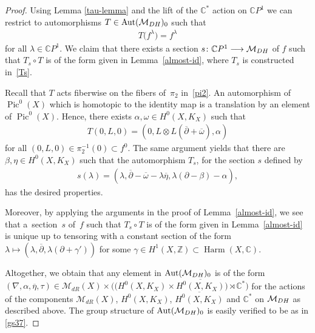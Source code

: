 \documentclass[11pt]{article}
\numberwithin{equation}{section}
\begin{document}
\begin{proof} Using Lemma \ref{tau-lemma} and the lift of the $\mathbb C^*$ action on $\mathbb C P^1$ we can restrict to automorphisms $T\in \operatorname{Aut}(\mathcal M_{\rm DH})_0$ such that
\begin{gather*}T\big(f^\lambda\big) = f^\lambda\end{gather*} for all $\lambda\in\mathbb CP^1$. We claim that there exists a section $s \colon {\mathbb C}P^1 \longrightarrow {\mathcal M}_{\rm DH}$ of $f$ such that $T_s\circ T$ is of the form given in Lemma~\ref{almost-id}, where $T_s$ is constructed in~\eqref{Ts}.

Recall that $T$ acts f\/iberwise on the f\/ibers of~$\pi_2$ in~\eqref{pi2}. An automorphism of $\operatorname{Pic}^0(X)$ which is homotopic to the identity map is a translation by an element of $\operatorname{Pic}^0(X)$. Hence, there exists $\alpha, \omega \in H^0(X, K_X)$ such that
\begin{gather*}T(0, L, 0) = (0, L\otimes L(\overline{\partial}+\overline{\omega}), \alpha)\end{gather*}
for all $(0, L, 0) \in \pi_2^{-1}(0) \subset f^0$. The same argument yields that there are $\beta, \eta \in H^0(X, K_X)$ such that the automorphism $T_s$, for the section $s$ def\/ined by
\begin{gather*}s(\lambda) = (\lambda, \overline{\partial} -\overline{\omega}-\lambda\overline{\eta}, \lambda(\partial-\beta)-\alpha) ,\end{gather*}
has the desired properties.

Moreover, by applying the arguments in the proof of Lemma~\ref{almost-id}, we see that a~section~$s$ of~$f$ such that $T_s\circ T$ is of the form given in Lemma~\ref{almost-id} is unique up to tensoring with a constant section of the form $\lambda \longmapsto (\lambda, \overline{\partial}, \lambda(\partial+\gamma'))$ for some $\gamma \in H^1(X, \mathbb Z) \subset \operatorname{Harm}(X, \mathbb C)$.

Altogether, we obtain that any element in $\operatorname{Aut}({\mathcal M}_{\rm DH})_0$ is of the form $(\nabla, \alpha, \overline{\eta}, \tau)\in\mathcal M_{dR}(X)\times \big(\big(H^0(X, K_X)\times\overline{H^0(X, K_X)}\big)\rtimes {\mathbb C}^*\big)$ for the actions of the components $\mathcal M_{dR}(X)$, $H^0(X, K_X)$, $\overline{H^0(X, K_X)}$ and ${\mathbb C}^*$ on ${\mathcal M}_{\rm DH}$ as described above. The group structure of $\operatorname{Aut}({\mathcal M}_{\rm DH})_0$ is easily verif\/ied to be as in \eqref{gs37}.
\end{proof}
\end{document}
